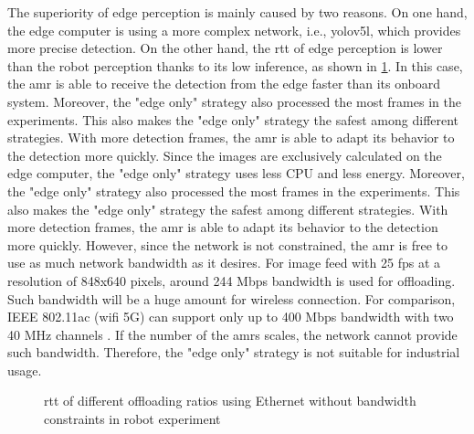 The superiority of edge perception is mainly caused by two reasons. On one hand, the edge computer is using a more complex network, i.e., \gls{yolo}v5l, which provides more precise detection. On the other hand, the \gls{rtt} of edge perception is lower than the robot perception thanks to its low inference, as shown in \cref{fig:robot_exp_rtt_320}. In this case, the \gls{amr} is able to receive the detection from the edge faster than its onboard system. Moreover, the "edge only" strategy also processed the most frames in the experiments. This also makes the "edge only" strategy the safest among different strategies. With more detection frames, the \gls{amr} is able to adapt its behavior to the detection more quickly. Since the images are exclusively calculated on the edge computer, the "edge only" strategy uses less CPU and less energy. Moreover, the "edge only" strategy also processed the most frames in the experiments. This also makes the "edge only" strategy the safest among different strategies. With more detection frames, the \gls{amr} is able to adapt its behavior to the detection more quickly. However, since the network is not constrained, the \gls{amr} is free to use as much network bandwidth as it desires. For image feed with 25 \gls{fps} at a resolution of 848x640 pixels, around 244 Mbps bandwidth is used for offloading. Such bandwidth will be a huge amount for wireless connection. For comparison, IEEE 802.11ac (\gls{wifi} 5G) can support only up to 400 Mbps bandwidth with two 40 MHz channels \cite{IntelCorporation2021}. If the number of the \glspl{amr} scales, the network cannot provide such bandwidth. Therefore, the "edge only" strategy is not suitable for industrial usage.

\begin{figure}
    \centering
    
    \caption{\gls{rtt} of different offloading ratios using Ethernet without bandwidth constraints in robot experiment}
    \label{fig:robot_exp_rtt_320}
\end{figure}

